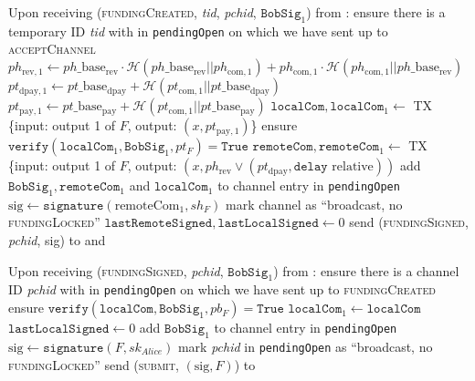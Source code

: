 \begin{algorithmic}[1]
    \State Upon receiving (\textsc{fundingCreated}, \textit{tid},
    \textit{pchid}, $\mathtt{BobSig}_1$) from \bob:
    \Indent
      \State ensure there is a temporary ID \textit{tid} with \bob{} in
      \texttt{pendingOpen} on which we have sent up to \textsc{acceptChannel}
      \State $ph_{\mathrm{rev}, 1} \gets ph\_\mathrm{base}_{\mathrm{rev}} \cdot
      \mathcal{H}\left(ph\_\mathrm{base}_{\mathrm{rev}} ||
      ph_{\mathrm{com}, 1}\right) + ph_{\mathrm{com}, 1} \cdot \mathcal{H}\left(
      ph_{\mathrm{com}, 1} || ph\_\mathrm{base}_{\mathrm{rev}}\right)$
      \State $pt_{\mathrm{dpay}, 1} \gets pt\_\mathrm{base}_{\mathrm{dpay}} +
      \mathcal{H}\left(pt_{\mathrm{com}, 1} ||
      pt\_\mathrm{base}_{\mathrm{dpay}}\right)$
      \State $pt_{\mathrm{pay}, 1} \gets pt\_\mathrm{base}_{\mathrm{pay}} +
      \mathcal{H}\left(pt_{\mathrm{com}, 1} ||
      pt\_\mathrm{base}_{\mathrm{pay}}\right)$
      \State $\mathtt{localCom}, \mathtt{localCom}_1 \gets$ TX \{input: output 1
      of $F$, output: $\left(x, pt_{\mathrm{pay}, 1}\right)$\}
      \State ensure $\mathtt{verify}\left(\mathtt{localCom}_1,
      \mathtt{BobSig}_1, pt_F\right) = \mathtt{True}$
      \State $\mathtt{remoteCom}, \mathtt{remoteCom}_1 \gets$ TX \{input: output
      1 of $F$, output: $\left(x, ph_{\mathrm{rev}} \vee
      \left(pt_{\mathrm{dpay}}, \mathtt{delay} \text{ relative}\right)\right)$
      \State add $\mathtt{BobSig}_1, \mathtt{remoteCom}_1$ and
      $\mathtt{localCom}_1$ to channel entry in \texttt{pendingOpen}
      \State $\mathrm{sig} \gets \mathtt{signature}\left(\mathrm{remoteCom}_1,
      sh_F\right)$
      \State mark channel as ``broadcast, no \textsc{fundingLocked}''
      \State $\mathtt{lastRemoteSigned}, \mathtt{lastLocalSigned} \gets 0$
      \State send (\textsc{fundingSigned}, \textit{pchid}, sig) to \bob{} and
      \adversary
    \EndIndent
    \State

    \State Upon receiving (\textsc{fundingSigned}, \textit{pchid},
    $\mathtt{BobSig}_1$) from \bob:
    \Indent
      \State ensure there is a channel ID \textit{pchid} with \bob{} in
      \texttt{pendingOpen} on which we have sent up to \textsc{fundingCreated}
      \State ensure $\mathtt{verify}\left(\mathtt{localCom}, \mathtt{BobSig}_1,
      pb_F\right) = \mathtt{True}$
      \State $\mathtt{localCom}_1 \gets \mathtt{localCom}$
      \State $\mathtt{lastLocalSigned} \gets 0$
      \State add $\mathtt{BobSig}_1$ to channel entry in \texttt{pendingOpen}
      \State $\mathrm{sig} \gets \mathtt{signature}\left(F,
      sk_{\mathit{Alice}}\right)$
      \State mark \textit{pchid} in \texttt{pendingOpen} as ``broadcast, no
      \textsc{fundingLocked}''
      \State send (\textsc{submit}, $\left(\mathrm{sig}, F\right)$) to \ledger
    \EndIndent
    \State


\end{algorithmic}
